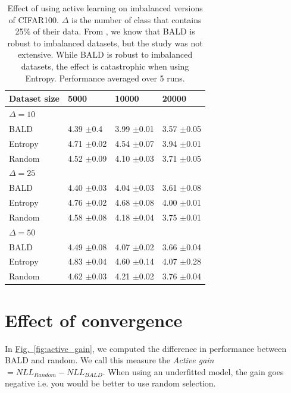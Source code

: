 \documentclass{article}
\newcommand{\figref}[1]{\hyperref[#1]{Fig.\ \ref*{#1}}}
\newcommand{\std}[1]{ \normalfont \color{darkgray}\footnotesize{$\pm$#1} }
\begin{document}
\begin{table}
    \centering
    \begin{tabular}{llll}
    
    \toprule
    Dataset size &         5000 &        10000 &        20000 \\
    
    \hline
   $\Delta =10$ \\
    BALD &  4.39 \std{0.4} &  3.99 \std{0.01} &  3.57 \std{0.05} \\
    Entropy &  4.71 \std{0.02} &  4.54 \std{0.07} &  3.94 \std{0.01} \\
    Random &  4.52 \std{0.09} &  4.10 \std{0.03} &  3.71 \std{0.05} \\
    \hline
   $\Delta =25$ \\
    BALD &  4.40 \std{0.03}	&4.04\std{0.03} &	3.61\std{0.08} \\
    Entropy &  4.76 \std{0.02} &  4.68 \std{0.08} &   4.00 \std{0.01} \\
    Random &  4.58 \std{0.08} &  4.18 \std{0.04} &  3.75 \std{0.01} \\
    \hline 
   $\Delta =50$ \\
    BALD &  4.49 \std{0.08} &   4.07 \std{0.02} &   3.66 \std{0.04} \\
    Entropy &  4.83 \std{0.04} &  4.60 \std{0.14} &  4.07 \std{0.28} \\
    Random &  4.62 \std{0.03} &   4.21 \std{0.02} &   3.76 \std{0.04} \\
    \end{tabular}
    \caption{Effect of using active learning on imbalanced versions of CIFAR100. $\Delta$ is the number of class that contains 25\% of their data. From \citep{gal2017deep}, we know that BALD is robust to imbalanced datasets, but the study was not extensive. While BALD is robust to imbalanced datasets, the effect is catastrophic when using Entropy.  Performance averaged over 5 runs.}
    \label{fig:imbalanced}
\end{table}

\section{Effect of convergence}

In \figref{fig:active_gain}, we computed the difference in performance between BALD and random. We call this measure the \textit{Active gain} $= NLL_{Random} - NLL_{BALD}$. When using an underfitted model, the gain goes negative i.e. you would be better to use random selection.
\end{document}

